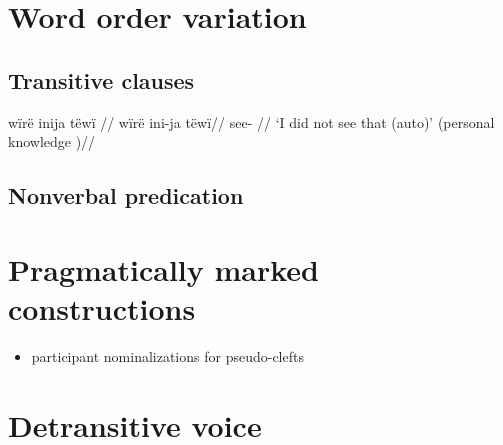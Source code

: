 \documentclass{memoir}
\begin{document}
\chapter{\texorpdfstring{Word order variation
\label{wordorder}}{Word order variation }}

\section{Transitive clauses}

\ex \label{histyarirdi-615}
\begingl \glpreamble wïrë inija tëwï //
\gla wïrë ini-ja tëwï//
\glb {} see- //
\glft ‘I did not see that (auto)’ (personal knowledge
)//
\endgl
\xe

\section{\texorpdfstring{Nonverbal predication
\label{nvp-order}}{Nonverbal predication }}

\chapter{\texorpdfstring{Pragmatically marked constructions
\label{pragmarked}}{Pragmatically marked constructions }}

\begin{itemize}
\tightlist
\item
  participant nominalizations for pseudo-clefts
\end{itemize}

\chapter{\texorpdfstring{Detransitive voice
\label{voice}}{Detransitive voice }}
\end{document}
